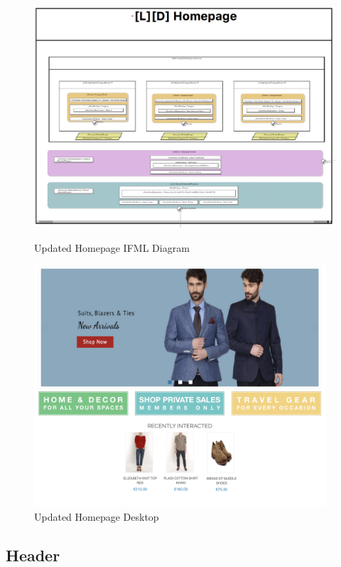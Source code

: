 \vspace{0.5cm}
\begin{figure}[H]
  \centering
    \includegraphics[height=9cm]{images/diagrams/after/ifml-homepage.png}
  \caption{Updated Homepage IFML Diagram}
  \label{fig:ifml-after-homepage}
\end{figure}

\begin{figure}[H]
  \centering
    \includegraphics[height=9cm]{images/diagrams/after/desktop-homepage.png}
  \caption{Updated Homepage Desktop}
  \label{fig:desktop-after-homepage}
\end{figure}
\vspace{0.5cm}

\newpage
\subsection{Header}

